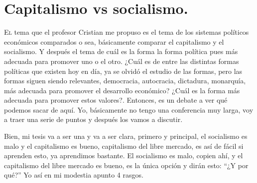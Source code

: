 \chapter{Capitalismo vs socialismo.}


\lettrine[lines=2, findent=3pt, nindent=0pt]{E}{l} tema que el profesor Cristian me propuso es el tema de los sistemas políticos económicos comparados o sea, básicamente comparar el capitalismo y el socialismo. Y después el tema de cuál es la forma la forma política pues más adecuada para promover uno o el otro. ¿Cuál es de entre las distintas formas políticas que existen hoy en día, ya se olvidó el estudio de las formas, pero las formas siguen siendo relevantes, democracia, autocracia, dictadura, monarquía, más adecuada para promover el desarrollo económico? ¿Cuál es la forma más adecuada para promover estos valores?. Entonces, es un debate a ver qué podemos sacar de aquí. Yo, básicamente no tengo una conferencia muy larga, voy a traer una serie de puntos y después los vamos a discutir.

Bien, mi tesis va a ser una y va a ser clara, primero y principal, el socialismo es malo y el capitalismo es bueno, capitalismo del libre mercado, es así de fácil si aprenden esto, ya aprendimos bastante. El socialismo es malo, copien ahí, y el capitalismo del libre mercado es bueno, es la única opción y dirán esto: \enquote{¿Y por qué?} Yo así en mi modestia apunto 4 rasgos.

